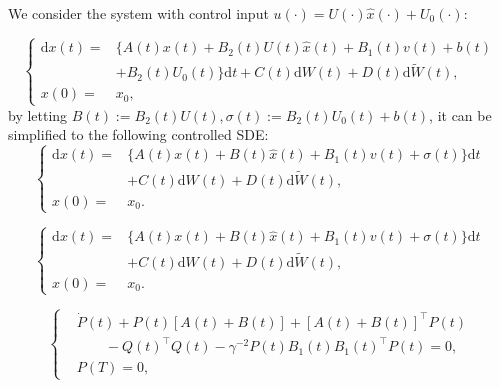 \documentclass[10pt,a4paper]{amsart}
\begin{document}
We consider the system with control input $u(\cdot) = U(\cdot)\widehat{x}(\cdot) + U_0(\cdot)$:

\begin{equation*}
	\left\{
	\begin{aligned}
		\mathrm{d}x(t) =& \Big\{ A(t)x(t) + B_2(t)U(t)\widehat{x}(t) + B_1(t)v(t) + b(t)\\
		& + B_2(t)U_0(t) \Big\} \mathrm{d}t + C(t)\mathrm{d}W(t) + D(t)\mathrm{d}\widetilde{W}(t),\\
		x(0)=&x_0,
	\end{aligned}
	\right.
\end{equation*}
by letting $B(t) := B_2(t)U(t), \sigma(t) := B_2(t)U_0(t) + b(t)$, it can be simplified to the following controlled SDE:
\begin{equation} \label{eq:3.1}
	\left\{
	\begin{aligned}
		\mathrm{d}x(t) =& \Big\{ A(t)x(t) + B(t)\widehat{x}(t) + B_1(t)v(t) +\sigma(t) \Big\} \mathrm{d}t\\
		& + C(t)\mathrm{d}W(t) + D(t)\mathrm{d}\widetilde{W}(t),\\
		x(0)=&x_0.
	\end{aligned}
	\right.
\end{equation}

\begin{equation} 
	\left\{
	\begin{aligned}
		\mathrm{d}x(t) =& \Big\{ A(t)x(t) + B(t)\widehat{x}(t) + B_1(t)v(t) +\sigma(t) \Big\} \mathrm{d}t\\
		& + C(t)\mathrm{d}W(t) + D(t)\mathrm{d}\widetilde{W}(t),\\
		x(0)=&x_0.
	\end{aligned}
	\right.
\end{equation}

\begin{equation}\label{eq:4.1}
	\left\{
	\begin{aligned}
		&\dot{P}(t) + P(t)[A(t) + B(t)] + [A(t) + B(t)]^\top P(t)\\
		&\qquad - Q(t)^\top Q(t) - \gamma^{-2}P(t)B_1(t)B_1(t)^\top{P}(t) = 0,\\
		&P(T) = 0,
	\end{aligned}
	\right.
\end{equation}
\end{document}
